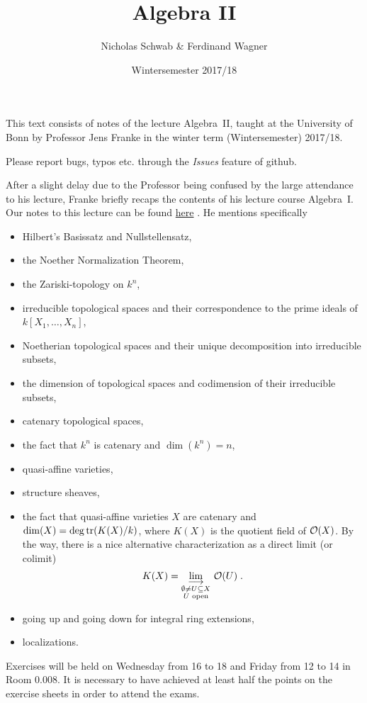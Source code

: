 \documentclass[a4paper,parskip=half,numbers=enddot, DIV=12]{scrreprt}
\title{Algebra II}
\author{Nicholas Schwab \& Ferdinand Wagner}
\date{Wintersemester 2017/18}
\begin{document}
\maketitle
{}
 \thispagestyle{plain}
This text consists of notes of the lecture Algebra~II, taught at the University of Bonn by Professor Jens Franke in the winter term (Wintersemester) 2017/18. 

Please report bugs, typos etc. through the \emph{Issues} feature of github.

\tableofcontents

After a slight delay due to the Professor being confused by the large attendance to his lecture, Franke briefly recaps the contents of his lecture course Algebra~I. Our notes to this lecture can be found \href{https://github.com/Nicholas42/AlgebraFranke/tree/master/AlgebraI}{here} \cite{alg1}. He mentions specifically
\begin{itemize}
 \item Hilbert's Basissatz and Nullstellensatz,
 \item the Noether Normalization Theorem,
 \item the Zariski-topology on $k^n$,
 \item irreducible topological spaces and their correspondence to the prime ideals of $k[X_1, \ldots, X_n]$,
 \item Noetherian topological spaces and their unique decomposition into irreducible subsets,
 \item the dimension of topological spaces and codimension of their irreducible subsets,
 \item catenary topological spaces,
 \item the fact that $k^n$ is catenary and $\dim(k^n) = n$,
 \item quasi-affine varieties,
 \item structure sheaves,
 \item the fact that quasi-affine varieties $X$ are catenary and $\dim (X) = \deg\operatorname{tr}(K(X)/k)$, where $K(X)$ is the quotient field of $\mathcal{O}(X)$. By the way, there is a nice alternative characterization as a direct limit (or colimit)
 \begin{align*}
 	K(X)=\colimit[\substack{\emptyset\not=U\subseteq X\\U\text{ open}}]\Oo(U)\;.
 \end{align*}
 \item going up and going down for integral ring extensions,
 \item localizations.
\end{itemize}
Exercises will be held on Wednesday from 16 to 18 and Friday from 12 to 14 in Room 0.008. It is necessary to have achieved at least half the points on the exercise sheets in order to attend the exams.
\end{document}
